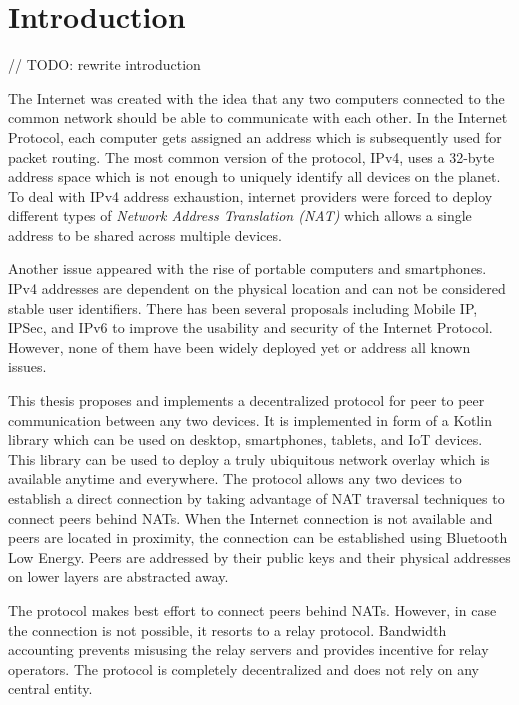 \chapter{Introduction}

// TODO: rewrite introduction

The Internet was created with the idea that any two computers connected to the common network should be able to communicate with each other. In the Internet Protocol, each computer gets assigned an address which is subsequently used for packet routing. The most common version of the protocol, IPv4, uses a 32-byte address space which is not enough to uniquely identify all devices on the planet. To deal with IPv4 address exhaustion, internet providers were forced to deploy different types of \textit{Network Address Translation (NAT)} which allows a single address to be shared across multiple devices.

Another issue appeared with the rise of portable computers and smartphones. IPv4 addresses are dependent on the physical location and can not be considered stable user identifiers. There has been several proposals including Mobile IP, IPSec, and IPv6 to improve the usability and security of the Internet Protocol. However, none of them have been widely deployed yet or address all known issues.


This thesis proposes and implements a decentralized protocol for peer to peer communication between any two devices. It is implemented in form of a Kotlin library which can be used on desktop, smartphones, tablets, and IoT devices. This library can be used to deploy a truly ubiquitous network overlay which is available anytime and everywhere. The protocol allows any two devices to establish a direct connection by taking advantage of NAT traversal techniques to connect peers behind NATs. When the Internet connection is not available and peers are located in proximity, the connection can be established using Bluetooth Low Energy. Peers are addressed by their public keys and their physical addresses on lower layers are abstracted away.

The protocol makes best effort to connect peers behind NATs. However, in case the connection is not possible, it resorts to a relay protocol. Bandwidth accounting prevents misusing the relay servers and provides incentive for relay operators. The protocol is completely decentralized and does not rely on any central entity.

